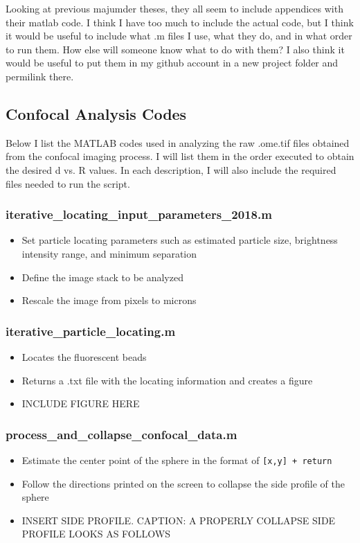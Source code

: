 
\def\code#1{\texttt{#1}}

Looking at previous majumder theses, they all seem to include appendices with their matlab code. I think I have too much to include the actual code, but I think it would be useful to include what .m files I use, what they do, and in what order to run them. How else will someone know what to do with them? I also think it would be useful to put them in my github account in a new project folder and permilink there.

\subsection{Confocal Analysis Codes}
Below I list the MATLAB codes used in analyzing the raw .ome.tif files obtained from the confocal imaging process. I will list them in the order executed to obtain the desired d vs. R values. In each description, I will also include the required files needed to run the script.

\subsubsection*{iterative\_locating\_input\_parameters\_2018.m}
\begin{itemize}
	\item Set particle locating parameters such as estimated particle size, brightness intensity range, and minimum separation
	\item Define the image stack to be analyzed
	\item Rescale the image from pixels to microns
\end{itemize}
\subsubsection*{iterative\_particle\_locating.m}
\begin{itemize}
	\item Locates the fluorescent beads
	\item Returns a .txt file with the locating information and creates a figure 
	\item INCLUDE FIGURE HERE
\end{itemize}
\subsubsection*{process\_and\_collapse\_confocal\_data.m}
\begin{itemize}
	\item Estimate the center point of the sphere in the format of \code{[x,y] + return}
	\item Follow the directions printed on the screen to collapse the side profile of the sphere
	\item INSERT SIDE PROFILE. CAPTION: A PROPERLY COLLAPSE SIDE PROFILE LOOKS AS FOLLOWS
\end{itemize}
